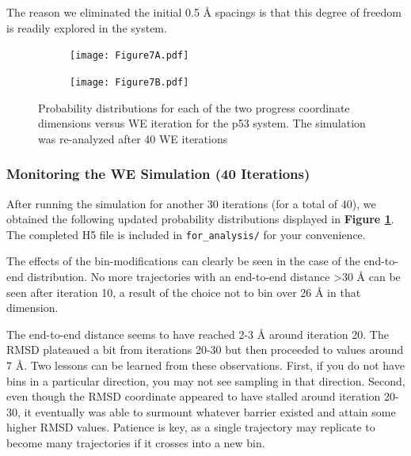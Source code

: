 The reason we eliminated the initial 0.5 \AA{} spacings is that this degree of freedom is readily explored in the system.

\begin{figure}[t]
\centering
\vspace{-0.25cm}
\begin{subfigure}[A]{0.35\textwidth}
\texttt{[image: Figure7A.pdf]}
\vspace{-0.75cm}
\end{subfigure}
\begin{subfigure}[B]{0.35\textwidth}
\texttt{[image: Figure7B.pdf]}
\end{subfigure}
\vspace{-0.75cm}
\caption{Probability distributions for each of the two progress coordinate dimensions versus WE iteration for the p53 system. 
The simulation was re-analyzed after 40 WE iterations}
\label{fig:p53-hist-40}
\vspace{-0.25cm}
\end{figure}

\subsubsection{Monitoring the WE Simulation (40 Iterations)}

After running the simulation for another 30 iterations (for a total of 40), we obtained the following updated probability distributions displayed in \textbf{Figure \ref{fig:p53-hist-40}}.
The completed H5 file is included in \verb|for_analysis/| for your convenience.

The effects of the bin-modifications can clearly be seen in the case of the end-to-end distribution. 
No more trajectories with an end-to-end distance >30 \AA{} can be seen after iteration 10, a result of the choice not to bin over 26 \AA{} in that dimension.

The end-to-end distance seems to have reached 2-3 \AA{} around iteration 20. 
The RMSD plateaued a bit from iterations 20-30 but then proceeded to values around 7 \AA.  
Two lessons can be learned from these observations. 
First, if you do not have bins in a particular direction, you may not see sampling in that direction. 
Second, even though the RMSD coordinate appeared to have stalled around iteration 20-30, it eventually was able to surmount whatever barrier existed and attain some higher RMSD values. 
Patience is key, as a single trajectory may replicate to become many trajectories if it crosses into a new bin.

